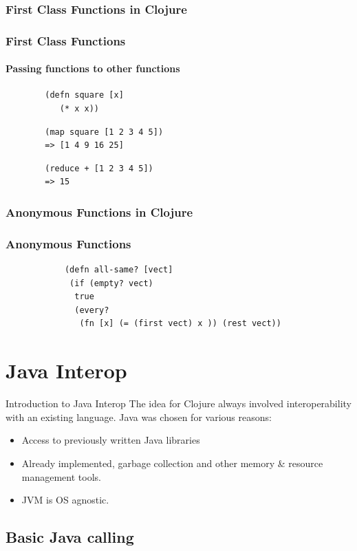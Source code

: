 \documentclass[xcolor=dvipsnames]{beamer}
\begin{document}
		\subsubsection{First Class Functions in Clojure}
		\begin{frame}[fragile]
		\frametitle{First Class Functions}
		\framesubtitle{Passing functions to other functions}
		
		\begin{verbatim}
		(defn square [x] 
		   (* x x))
		\end{verbatim}
		\pause
		\begin{verbatim}
		(map square [1 2 3 4 5])
		=> [1 4 9 16 25]
		\end{verbatim}
		\pause
		\begin{verbatim}
		(reduce + [1 2 3 4 5])
		=> 15
		\end{verbatim}
		\end{frame}
		\subsubsection{Anonymous Functions in Clojure}
		\begin{frame}[fragile]
		\frametitle{Anonymous Functions}
		\begin{verbatim}
			(defn all-same? [vect]
			 (if (empty? vect) 
			  true
			  (every? 
			   (fn [x] (= (first vect) x )) (rest vect))
		\end{verbatim}		
		\end{frame}
	\section{Java Interop}
		\begin{frame}{Introduction to Java Interop}
			The idea for Clojure always involved interoperability with an existing language. Java was chosen for various reasons:
			\begin{itemize}
				\item Access to previously written Java libraries
				\item Already implemented, garbage collection and other memory \& resource management tools.
				\item JVM is OS agnostic.
			\end{itemize}
		\end{frame}
		\subsection{Basic Java calling}
		
\end{document}
